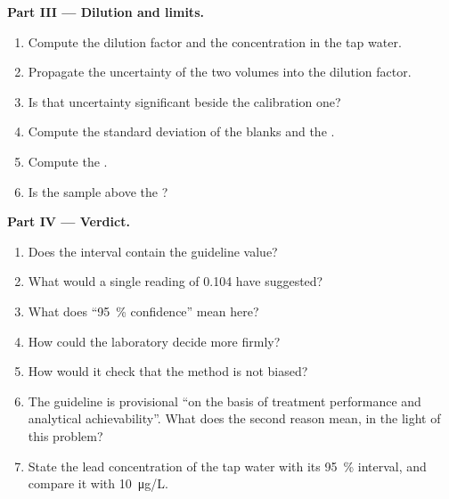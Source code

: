 \begin{problem}
\medskip
\noindent\textbf{Part III --- Dilution and limits.}
\begin{enumerate}[resume]
  \item Compute the dilution factor and the concentration in the tap water.
  \item Propagate the uncertainty of the two volumes into the dilution factor.
  \item Is that uncertainty significant beside the calibration one?
  \item Compute the standard deviation of the blanks and the .
  \item Compute the .
  \item Is the sample above the ?
\end{enumerate}

\medskip
\noindent\textbf{Part IV --- Verdict.}
\begin{enumerate}[resume]
  \item Does the interval contain the guideline value?
  \item What would a single reading of 0.104 have suggested?
  \item What does ``95~\% confidence'' mean here?
  \item How could the laboratory decide more firmly?
  \item How would it check that the method is not biased?
  \item The guideline is provisional ``on the basis of treatment performance and analytical
        achievability''. What does the second reason mean, in the light of this problem?
  \item State the lead concentration of the tap water with its 95~\% interval, and compare it with
        \qty{10}{\micro g/L}.
\end{enumerate}
\end{problem}
